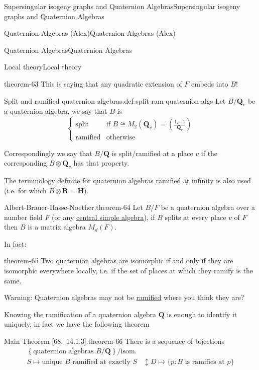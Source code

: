 \documentclass[10pt,]{book}
\numberwithin{equation}{section}
\newcommand{\legendre}[2]{\left(\frac{#1}{#2}\right)}
\newcommand{\QQ}{\mathbf{Q}}
\newcommand{\RR}{\mathbf{R}}
\newcommand{\HH}{\mathbf{H}}
\newcommand{\amp}{&}
\begin{document}
\begin{chapterptx}{Supersingular isogeny graphs and Quaternion Algebras}{}{Supersingular isogeny graphs and Quaternion Algebras}{}{}
\begin{sectionptx}{Quaternion Algebras (Alex)}{}{Quaternion Algebras (Alex)}{}{}
\begin{subsectionptx}{Quaternion Algebras}{}{Quaternion Algebras}{}{}
\begin{subsubsectionptx}{Local theory}{}{Local theory}{}{}
\begin{theorem}{}{}{theorem-63}
This is saying that any quadratic extension of \(F\) embeds into \(B\)!%
\end{theorem}
\begin{definition}{Split and ramified quaternion algebras.}{def-split-ram-quaternion-algs}%
\hypertarget{p-923}{}%
Let \(B/\QQ_v\) be a quaternion algebra, we say that \(B\) is%
\begin{equation*}
\begin{cases}
\text{split} \amp \text{if } B\cong M_2(\QQ_v)  = \legendre{1,-1}{\QQ_v}\\
\text{ramified} \amp \text{otherwise}
\end{cases}
\end{equation*}
%
\par
\hypertarget{p-924}{}%
Correspondingly we say that \(B/\QQ\) is split/ramified at a place \(v\) if the corresponding \(B\otimes \QQ_v\) has that property.%
\end{definition}
\hypertarget{p-925}{}%
The terminology definite for quaternion algebras \hyperref[def-dess-ramified]{ramified} at infinity is also used (i.e. for which \(B\otimes \RR = \HH\)).%
\begin{theorem}{Albert-Brauer-Hasse-Noether.}{}{theorem-64}%
\hypertarget{p-926}{}%
Let \(B/F\) be a quaternion algebra  over  a  number field \(F\) (or any \hyperref[def-abvar-csa]{central \hyperref[def-simple-av]{simple} algebra}), if \(B\) splits at every place \(v\) of \(F\) then \(B\) is a matrix algebra \(M_d (F)\).%
\end{theorem}
\hypertarget{p-927}{}%
In fact:%
\begin{theorem}{}{}{theorem-65}%
\hypertarget{p-928}{}%
Two quaternion algebras are isomorphic if and only if they are isomorphic everywhere locally, i.e. if the set of places at which they ramify is the same.%
\end{theorem}
\hypertarget{p-929}{}%
Warning: Quaternion algebras may not be \hyperref[def-dess-ramified]{ramified} where you think they are?%
\par
\hypertarget{p-930}{}%
Knowing the ramification of a quaternion algebra \(\QQ\) is enough to identify it uniquely, in fact we have the following theorem%
\begin{theorem}{Main Theorem [68,~14.1.3].}{}{theorem-66}%
\hypertarget{p-931}{}%
There is a sequence of bijections%
\begin{align*}
\left\{ \text{quaternion algebras }B/\QQ \right\}/\text{isom.}\\
S \mapsto \text{unique }B \text{ ramified at exactly }S\amp\updownarrow D\mapsto \{p : B \text{ is ramifies at } p\}\\

\end{align*}
\end{theorem}
\end{subsubsectionptx}
\end{subsectionptx}
\end{sectionptx}
\end{chapterptx}
\end{document}
